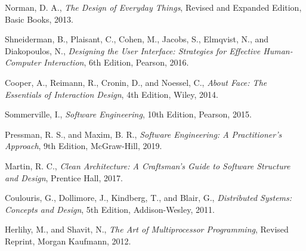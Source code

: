 \vspace{0.3cm}

\noindent [15] Norman, D. A., \textit{The Design of Everyday Things}, Revised and Expanded Edition, Basic Books, 2013.

\vspace{0.2cm}

\noindent [16] Shneiderman, B., Plaisant, C., Cohen, M., Jacobs, S., Elmqvist, N., and Diakopoulos, N., \textit{Designing the User Interface: Strategies for Effective Human-Computer Interaction}, 6th Edition, Pearson, 2016.

\vspace{0.2cm}

\noindent [17] Cooper, A., Reimann, R., Cronin, D., and Noessel, C., \textit{About Face: The Essentials of Interaction Design}, 4th Edition, Wiley, 2014.


\vspace{0.3cm}

\noindent [18] Sommerville, I., \textit{Software Engineering}, 10th Edition, Pearson, 2015.

\vspace{0.2cm}

\noindent [19] Pressman, R. S., and Maxim, B. R., \textit{Software Engineering: A Practitioner's Approach}, 9th Edition, McGraw-Hill, 2019.

\vspace{0.2cm}

\noindent [20] Martin, R. C., \textit{Clean Architecture: A Craftsman's Guide to Software Structure and Design}, Prentice Hall, 2017.


\vspace{0.3cm}

\noindent [21] Coulouris, G., Dollimore, J., Kindberg, T., and Blair, G., \textit{Distributed Systems: Concepts and Design}, 5th Edition, Addison-Wesley, 2011.

\vspace{0.2cm}

\noindent [22] Herlihy, M., and Shavit, N., \textit{The Art of Multiprocessor Programming}, Revised Reprint, Morgan Kaufmann, 2012.

